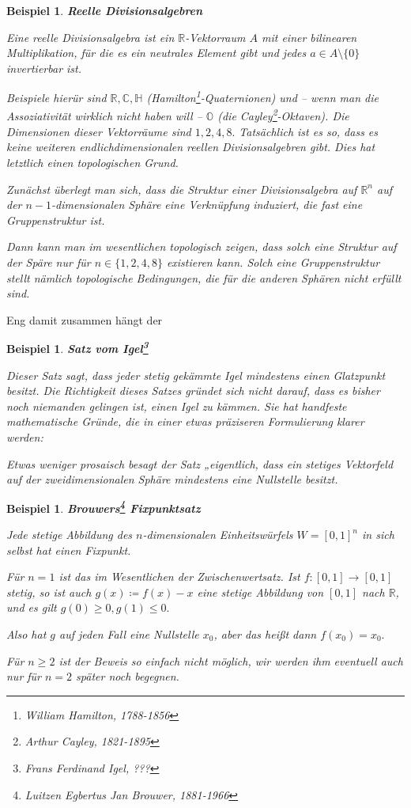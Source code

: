 \documentclass[12pt]{scrbook}   %
\newtheorem{bspX}[alles]{Beispiel}
\newenvironment{bsp}[1]{\begin{bspX}{\bf #1}\par\rm}{\end{bspX}}
\newcommand{\da}{\coloneqq}
\begin{document}
\begin{bsp} {\bf Reelle Divisionsalgebren}

{\rm Eine reelle Divisionsalgebra ist ein $\mathbb R$-Vektorraum $A$ mit einer
bilinearen Multiplikation, für die es ein neutrales Element gibt und jedes
$a\in A\setminus\{0\}$ invertierbar ist. 

Beispiele hierür sind $\mathbb R,\mathbb C, \mathbb H$ 
(Hamilton\footnote{William Hamilton, 1788-1856}-Quaternionen) und -- wenn man 
die Assoziativität wirklich nicht haben will -- $\mathbb O$ (die 
Cayley\footnote{Arthur Cayley, 1821-1895}-Oktaven). Die Dimensionen dieser 
Vektorräume sind $1,2,4,8.$ Tatsächlich ist es so, dass es keine weiteren
endlichdimensionalen reellen Divisionsalgebren gibt. Dies
hat letztlich einen topologischen Grund. 

Zunächst überlegt man sich, dass die Struktur einer Divisionsalgebra auf 
$\mathbb R^n$ auf der $n-1$-dimensionalen Sphäre eine Verknüpfung
induziert, die fast eine Gruppenstruktur ist.

Dann kann man im wesentlichen topologisch zeigen, dass solch eine Struktur
auf der Späre nur für
$n\in\{1,2,4,8\}$ existieren kann. Solch eine Gruppenstruktur stellt nämlich 
topologische Bedingungen, die für die anderen Sphären nicht erfüllt sind.
}\end{bsp}



Eng damit zusammen hängt der

\begin{bsp} {\bf Satz vom Igel\footnote{Frans Ferdinand Igel, ???}}

{\rm Dieser Satz sagt, dass jeder stetig gekämmte Igel mindestens einen 
Glatzpunkt besitzt. Die Richtigkeit dieses Satzes gründet sich nicht darauf, 
dass es bisher noch niemanden gelingen ist, einen Igel zu kämmen. Sie hat
handfeste mathematische Gründe, die in einer etwas präziseren Formulierung 
klarer werden:

Etwas weniger prosaisch besagt der Satz „eigentlich\grqq, dass ein 
stetiges Vektorfeld auf der zweidimensionalen Sphäre mindestens eine
Nullstelle besitzt.
}
\end{bsp}

\begin{bsp} {\bf Brouwers\footnote{Luitzen Egbertus Jan Brouwer, 1881-1966}
Fixpunktsatz}

{\rm Jede stetige Abbildung des $n$-dimensionalen Einheitswürfels 
$W=[0,1]^n$ in sich selbst hat einen Fixpunkt.

Für $n=1$ ist das im Wesentlichen der Zwischenwertsatz. Ist $f:[0,1]
\longrightarrow [0,1]$ stetig, so ist auch $g(x) \da f(x)-x$ eine stetige 
Abbildung von $[0,1]$ nach $\mathbb R$, und es gilt $g(0)\geq 0, g(1)\leq 0.$

Also hat $g$ auf jeden Fall eine Nullstelle $x_0$, aber das heißt dann 
$f(x_0) = x_0.$

Für $n\geq 2$ ist der Beweis so einfach nicht möglich, wir werden ihm 
eventuell auch nur für $n=2$ später noch begegnen.
}
\end{bsp}
\end{document}
